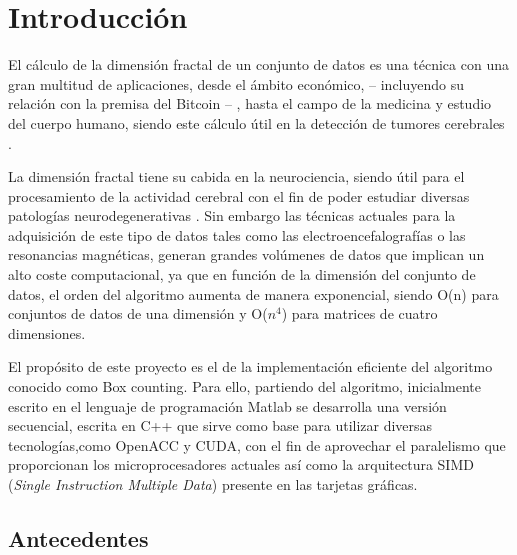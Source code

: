 \chapter{Introducción}


El cálculo de la dimensión fractal de un conjunto de datos es una técnica con una gran multitud de aplicaciones, desde el ámbito económico, -- incluyendo su relación con la premisa del Bitcoin --  {\cite{delfin2016fractal}}, hasta el campo de la medicina y estudio del cuerpo humano, siendo este cálculo útil en la detección de tumores cerebrales {\cite{iftekharuddin2009fractal}}.

La dimensión fractal tiene su cabida en la neurociencia, siendo útil para el procesamiento de la actividad cerebral con el fin de poder estudiar diversas patologías neurodegenerativas \cite{fernandez2001use}. Sin embargo las técnicas actuales para la adquisición de este tipo de datos tales como las electroencefalografías o las resonancias magnéticas, generan grandes volúmenes de datos que implican un alto coste computacional, ya que en función de la dimensión del conjunto de datos, el orden del algoritmo aumenta de manera exponencial, siendo O(n) para conjuntos de datos de una dimensión y O($n^{4}$)  para matrices de cuatro dimensiones.

El propósito de este proyecto es el de la implementación eficiente del algoritmo conocido como Box counting. Para ello, partiendo del algoritmo, inicialmente escrito en el lenguaje de programación Matlab se desarrolla una versión secuencial, escrita en C++ que sirve como base para utilizar diversas tecnologías,como OpenACC y CUDA, con el fin de aprovechar el paralelismo que proporcionan los microprocesadores actuales así como la arquitectura SIMD (\textit{Single Instruction Multiple Data}) presente en las tarjetas gráficas.


\section{Antecedentes}

